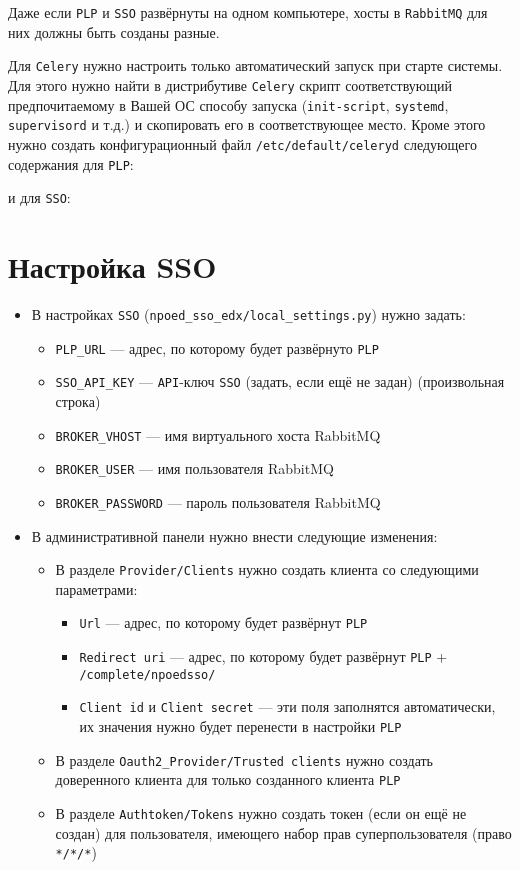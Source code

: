 Даже если \texttt{PLP} и \texttt{SSO} развёрнуты на одном компьютере, хосты в \texttt{RabbitMQ} для них должны быть созданы разные.

Для \texttt{Celery} нужно настроить только автоматический запуск при старте системы. Для этого нужно найти в дистрибутиве \texttt{Celery}
скрипт соответствующий предпочитаемому в Вашей ОС способу запуска (\texttt{init-script}, \texttt{systemd}, \texttt{supervisord} и т.д.)
и скопировать его в соответствующее место. Кроме этого нужно создать конфигурационный файл \texttt{/etc/default/celeryd} следующего содержания
для \texttt{PLP}:

и для \texttt{SSO}:


\section{Настройка SSO}
\begin{itemize}
	\item В настройках \texttt{SSO} (\texttt{npoed\_sso\_edx/local\_settings.py}) нужно задать:
	\begin{itemize}
		\item \texttt{PLP\_URL} --- адрес, по которому будет развёрнуто \texttt{PLP}
		\item \texttt{SSO\_API\_KEY} --- \texttt{API}-ключ \texttt{SSO} (задать, если ещё не задан) (произвольная строка)
		\item \texttt{BROKER\_VHOST} --- имя виртуального хоста RabbitMQ
		\item \texttt{BROKER\_USER} --- имя пользователя RabbitMQ
		\item \texttt{BROKER\_PASSWORD} --- пароль пользователя RabbitMQ
	\end{itemize}
	\item В административной панели нужно внести следующие изменения:
	\begin{itemize}
		\item В разделе \texttt{Provider/Clients} нужно создать клиента со следующими параметрами:
		\begin{itemize}
			\item \texttt{Url} --- адрес, по которому будет развёрнут \texttt{PLP}
			\item \texttt{Redirect uri} --- адрес, по которому будет развёрнут \texttt{PLP} + \texttt{/complete/npoedsso/}
			\item \texttt{Client id} и \texttt{Client secret} --- эти поля заполнятся автоматически,
				их значения нужно будет перенести в настройки \texttt{PLP}
		\end{itemize}
		\item В разделе \texttt{Oauth2\_Provider/Trusted clients} нужно создать доверенного клиента для только созданного клиента \texttt{PLP}
		\item В разделе \texttt{Authtoken/Tokens} нужно создать токен (если он ещё не создан) для пользователя, имеющего набор прав суперпользователя
			(право \texttt{*/*/*})
	\end{itemize}
\end{itemize}

